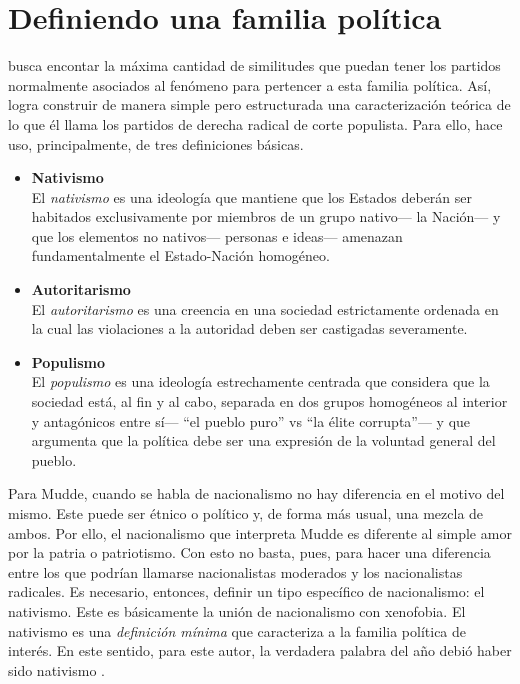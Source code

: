 \section{Definiendo una familia política}

\citeauthor{Mudde07a} busca encontar la máxima cantidad de similitudes que puedan tener los partidos normalmente asociados al fenómeno para pertencer a esta familia política. Así, logra construir de manera simple pero estructurada una caracterización teórica de lo que él llama los partidos de derecha radical de corte populista. Para ello, hace uso, principalmente, de tres definiciones básicas.

\begin{itemize}
\item \textbf{Nativismo}\\
El \textit{nativismo} es una ideología que mantiene que los Estados deberán ser habitados exclusivamente por miembros de un grupo nativo--- la Nación--- y que los elementos no nativos--- personas e ideas--- amenazan fundamentalmente el Estado-Nación homogéneo.

\item \textbf{Autoritarismo}\\
El \textit{autoritarismo} es una creencia en una sociedad estrictamente ordenada en la cual las violaciones a la autoridad deben ser castigadas severamente.

\item \textbf{Populismo}\\
El \textit{populismo} es una ideología estrechamente centrada que considera que la sociedad está, al fin y al cabo, separada en dos grupos homogéneos al interior y antagónicos entre sí--- ``el pueblo puro'' vs ``la élite corrupta''--- y que argumenta que la política debe ser una expresión de la voluntad general del pueblo.
\end{itemize}

Para Mudde, cuando se habla de nacionalismo no hay diferencia en el motivo del mismo. Este puede ser étnico o político y, de forma más usual, una mezcla de ambos. Por ello, el nacionalismo que interpreta Mudde es diferente al simple amor por la patria o patriotismo. Con esto no basta, pues, para hacer una diferencia entre los que podrían llamarse nacionalistas moderados y los nacionalistas radicales. Es necesario, entonces, definir un tipo específico de nacionalismo: el nativismo. Este es básicamente la unión de nacionalismo con xenofobia. El nativismo es una \textit{definición mínima} que caracteriza a la familia política de interés. En este sentido, para este autor, la verdadera palabra del año debió haber sido nativismo \parencite{MuddeCambridge17}.\\

